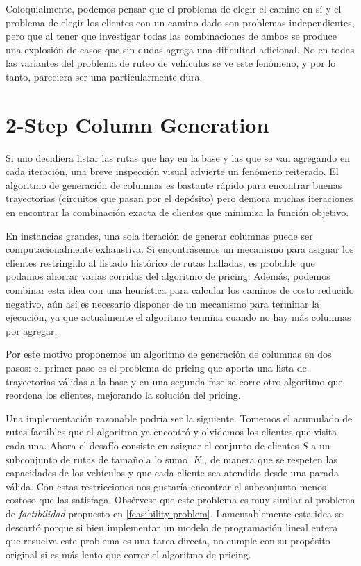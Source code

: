 Coloquialmente, podemos pensar que el problema de elegir el camino en sí y el problema de elegir los clientes con un camino dado son problemas independientes, pero que al tener que investigar todas las combinaciones de ambos se produce una explosión de casos que sin dudas agrega una dificultad adicional. No en todas las variantes del problema de ruteo de vehículos se ve este fenómeno, y por lo tanto,  pareciera ser una particularmente dura. 

\section{2-Step Column Generation}
\label{section:2-step-cg}

Si uno decidiera listar las rutas que hay en la base y las que se van agregando en cada iteración, una breve inspección visual advierte un fenómeno reiterado. El algoritmo de generación de columnas es bastante rápido para encontrar buenas trayectorias (circuitos que pasan por el depósito) pero demora muchas iteraciones en encontrar la combinación exacta de clientes que minimiza la función objetivo.  

En instancias grandes, una sola iteración de generar columnas puede ser com\-putacionalmente exhaustiva. Si encontrásemos un mecanismo para asignar los clientes restringido al listado histórico de rutas halladas, es probable que podamos ahorrar varias corridas del algoritmo de pricing. Además, podemos combinar esta idea con una heurística para calcular los caminos de costo reducido negativo, aún así es necesario disponer de un mecanismo para terminar la ejecución, ya que actualmente el algoritmo termina cuando no hay más columnas por agregar.

Por este motivo proponemos un algoritmo de generación de columnas en dos pasos: el primer paso es el problema de pricing que aporta una lista de trayectorias válidas a la base y en una segunda fase se corre otro algoritmo que reordena los clientes, mejorando la solución del pricing.

Una implementación razonable podría ser la siguiente. Tomemos el acumulado de rutas factibles que el algoritmo ya encontró y olvidemos los clientes que visita cada una. Ahora el desafío consiste en asignar el conjunto de clientes $S$ a un subconjunto de rutas de tamaño a lo sumo $|K|$, de manera que se respeten las capacidades de los vehículos y que cada cliente sea atendido desde una parada válida. Con estas restricciones nos gustaría encontrar el subconjunto menos costoso que las satisfaga. Obsérvese que este problema es muy similar al problema de \emph{factibilidad} propuesto en \ref{feasibility-problem}. Lamentablemente esta idea se descartó porque si bien implementar un modelo de programación lineal entera que resuelva este problema es una tarea directa, no cumple con su propósito original si es más lento que correr el algoritmo de pricing. 

